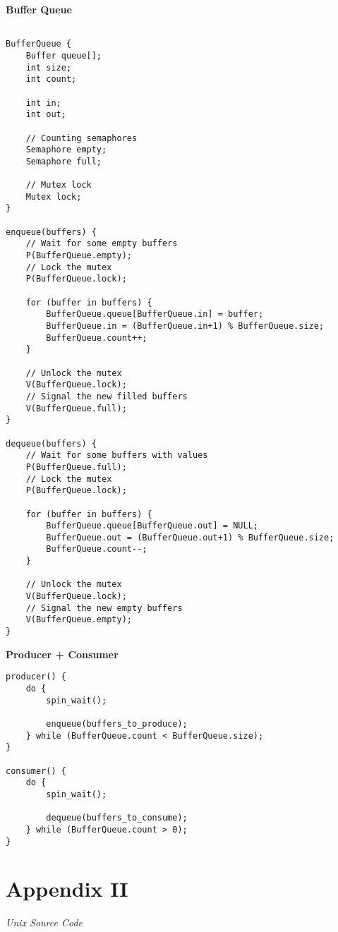 \documentclass[12pt]{article}
\newcommand {\filename}[1] {\flushleft \textbf{#1}}
\newcommand {\append}[2] {\section*{Appendix #1} \textsl{\large #2}}
\begin{document}
\filename{Buffer Queue}
\begin{scriptsize}
\begin{verbatim}

BufferQueue {
    Buffer queue[];
    int size;
    int count;

    int in;
    int out;

    // Counting semaphores
    Semaphore empty;
    Semaphore full;

    // Mutex lock
    Mutex lock;
}

enqueue(buffers) {
    // Wait for some empty buffers
    P(BufferQueue.empty);
    // Lock the mutex
    P(BufferQueue.lock);

    for (buffer in buffers) {
        BufferQueue.queue[BufferQueue.in] = buffer;
        BufferQueue.in = (BufferQueue.in+1) % BufferQueue.size;
        BufferQueue.count++;
    }

    // Unlock the mutex
    V(BufferQueue.lock);
    // Signal the new filled buffers
    V(BufferQueue.full);
}

dequeue(buffers) {
    // Wait for some buffers with values
    P(BufferQueue.full);
    // Lock the mutex
    P(BufferQueue.lock);

    for (buffer in buffers) {
        BufferQueue.queue[BufferQueue.out] = NULL;
        BufferQueue.out = (BufferQueue.out+1) % BufferQueue.size;
        BufferQueue.count--;
    }
    
    // Unlock the mutex
    V(BufferQueue.lock);
    // Signal the new empty buffers
    V(BufferQueue.empty);
}

\end{verbatim}
\end{scriptsize}

\filename{Producer + Consumer}
\begin{scriptsize}
\begin{verbatim}
producer() {
    do {
        spin_wait();

        enqueue(buffers_to_produce);
    } while (BufferQueue.count < BufferQueue.size);
}

consumer() {
    do {
        spin_wait();

        dequeue(buffers_to_consume);
    } while (BufferQueue.count > 0);
}
\end{verbatim}
\end{scriptsize}


\append{II} {Unix Source Code}
\end{document}
